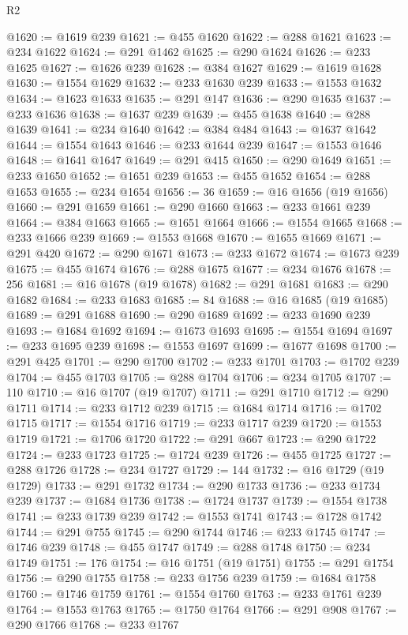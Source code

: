 \begin{lexlean}{R2}
\begin{coremodule}
@1620 := @1619 @239
@1621 := @455 @1620
@1622 := @288 @1621
@1623 := @234 @1622
@1624 := @291 @1462
@1625 := @290 @1624
@1626 := @233 @1625
@1627 := @1626 @239
@1628 := @384 @1627
@1629 := @1619 @1628
@1630 := @1554 @1629
@1632 := @233 @1630 @239
@1633 := @1553 @1632
@1634 := @1623 @1633
@1635 := @291 @147
@1636 := @290 @1635
@1637 := @233 @1636
@1638 := @1637 @239
@1639 := @455 @1638
@1640 := @288 @1639
@1641 := @234 @1640
@1642 := @384 @484
@1643 := @1637 @1642
@1644 := @1554 @1643
@1646 := @233 @1644 @239
@1647 := @1553 @1646
@1648 := @1641 @1647
@1649 := @291 @415
@1650 := @290 @1649
@1651 := @233 @1650
@1652 := @1651 @239
@1653 := @455 @1652
@1654 := @288 @1653
@1655 := @234 @1654
@1656 := 36
@1659 := @16 @1656 (@19 @1656)
@1660 := @291 @1659
@1661 := @290 @1660
@1663 := @233 @1661 @239
@1664 := @384 @1663
@1665 := @1651 @1664
@1666 := @1554 @1665
@1668 := @233 @1666 @239
@1669 := @1553 @1668
@1670 := @1655 @1669
@1671 := @291 @420
@1672 := @290 @1671
@1673 := @233 @1672
@1674 := @1673 @239
@1675 := @455 @1674
@1676 := @288 @1675
@1677 := @234 @1676
@1678 := 256
@1681 := @16 @1678 (@19 @1678)
@1682 := @291 @1681
@1683 := @290 @1682
@1684 := @233 @1683
@1685 := 84
@1688 := @16 @1685 (@19 @1685)
@1689 := @291 @1688
@1690 := @290 @1689
@1692 := @233 @1690 @239
@1693 := @1684 @1692
@1694 := @1673 @1693
@1695 := @1554 @1694
@1697 := @233 @1695 @239
@1698 := @1553 @1697
@1699 := @1677 @1698
@1700 := @291 @425
@1701 := @290 @1700
@1702 := @233 @1701
@1703 := @1702 @239
@1704 := @455 @1703
@1705 := @288 @1704
@1706 := @234 @1705
@1707 := 110
@1710 := @16 @1707 (@19 @1707)
@1711 := @291 @1710
@1712 := @290 @1711
@1714 := @233 @1712 @239
@1715 := @1684 @1714
@1716 := @1702 @1715
@1717 := @1554 @1716
@1719 := @233 @1717 @239
@1720 := @1553 @1719
@1721 := @1706 @1720
@1722 := @291 @667
@1723 := @290 @1722
@1724 := @233 @1723
@1725 := @1724 @239
@1726 := @455 @1725
@1727 := @288 @1726
@1728 := @234 @1727
@1729 := 144
@1732 := @16 @1729 (@19 @1729)
@1733 := @291 @1732
@1734 := @290 @1733
@1736 := @233 @1734 @239
@1737 := @1684 @1736
@1738 := @1724 @1737
@1739 := @1554 @1738
@1741 := @233 @1739 @239
@1742 := @1553 @1741
@1743 := @1728 @1742
@1744 := @291 @755
@1745 := @290 @1744
@1746 := @233 @1745
@1747 := @1746 @239
@1748 := @455 @1747
@1749 := @288 @1748
@1750 := @234 @1749
@1751 := 176
@1754 := @16 @1751 (@19 @1751)
@1755 := @291 @1754
@1756 := @290 @1755
@1758 := @233 @1756 @239
@1759 := @1684 @1758
@1760 := @1746 @1759
@1761 := @1554 @1760
@1763 := @233 @1761 @239
@1764 := @1553 @1763
@1765 := @1750 @1764
@1766 := @291 @908
@1767 := @290 @1766
@1768 := @233 @1767

\end{coremodule}
\end{lexlean}
